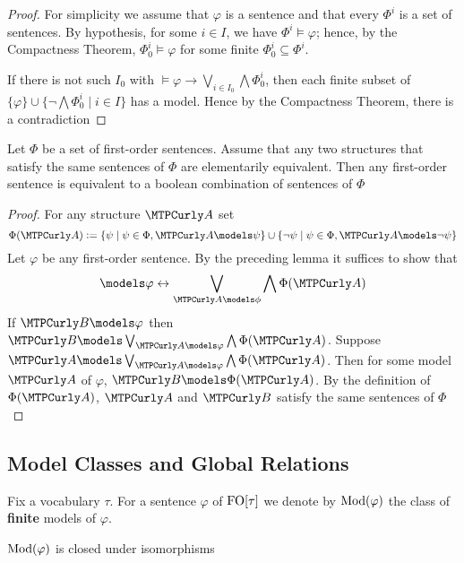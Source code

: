 \documentclass[11pt]{article}
\begin{document}
\begin{proof}
For simplicity we assume that \(\varphi\) is a sentence and that every
\(\Phi^i\) is a set of sentences. By hypothesis, for some \(i\in I\), we
have \(\Phi^i\models\varphi\); hence, by the Compactness Theorem,
\(\Phi^i_0\models\varphi\) for some finite \(\Phi^i_0\subseteq\Phi^i\).

If there is not such \(I_0\) with \(\models\varphi\to\bigvee_{i\in
    I_0}\bigwedge\Phi_0^i\), then each finite subset of
\(\{\varphi\}\cup\{\neg\bigwedge\Phi^i_0\mid i\in I\}\) has a model. Hence by
the Compactness Theorem, there is a contradiction
\end{proof}

\begin{corollary}[]
Let \(\Phi\) be a set of first-order sentences. Assume that any two structures
that satisfy the same sentences of \(\Phi\) are elementarily equivalent. Then
any first-order sentence is equivalent to a boolean combination of sentences
of \(\Phi\)
\end{corollary}

\begin{proof}
For any structure \(\cala\) set
\begin{equation*}
\Phi(\cala):=\{\psi\mid\psi\in\Phi,\cala\models\psi\}\cup
\{\neg\psi\mid\psi\in\Phi,\cala\models\neg\psi\}
\end{equation*}
Let \(\varphi\) be any first-order sentence. By the preceding lemma it
suffices to show that
\begin{equation*}
\models\varphi\leftrightarrow\bigvee_{\cala\models\phi}\bigwedge\Phi(\cala)
\end{equation*}
If \(\calb\models\varphi\) then
\(\calb\models\bigvee_{\cala\models\varphi}\bigwedge\Phi(\cala)\). Suppose
\(\cala\models\bigvee_{\cala\models\varphi}\bigwedge\Phi(\cala)\). Then for
some model \(\cala\) of \(\varphi\), \(\calb\models\Phi(\cala)\). By the
definition of \(\Phi(\cala)\), \(\cala\) and \(\calb\) satisfy the same
sentences of \(\Phi\)
\end{proof}

\subsection{Model Classes and Global Relations}
\label{sec:org8b57e7c}
Fix a vocabulary \(\tau\). For a sentence \(\varphi\) of \(\operatorname{FO}[\tau]\) we denote by
\(\operatorname{Mod}(\varphi)\) the class of \textbf{finite} models of \(\varphi\).

\(\operatorname{Mod}(\varphi)\) is closed under isomorphisms
\end{document}
